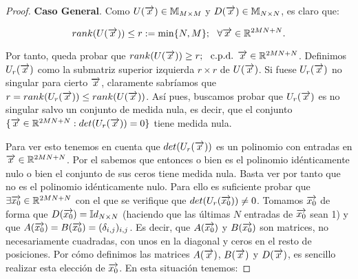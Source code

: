 \begin{proof}
    \textbf{Caso General}. Como $U(\overrightarrow{x}) \in \mathbb{M}_{M \times M}$ y $D(\overrightarrow{x}) \in \mathbb{M}_{N \times N}$, es claro que:

    \begin{equation}
        rank(U(\overrightarrow{x})) \leq r := \min \{ N, M  \}; \ \  \forall \overrightarrow{x} \in \mathbb{R}^{2MN + N}.
    \end{equation}

    Por tanto, queda probar que $rank(U(\overrightarrow{x})) \geq r; \ \  \text{c.p.d. } \overrightarrow{x} \in \mathbb{R}^{2MN + N}$. Definimos $U_r(\overrightarrow{x})$ como la submatriz superior izquierda $r \times r$ de $U(\overrightarrow{x})$. Si fuese $U_r(\overrightarrow{x})$ no singular para cierto $\overrightarrow{x}$, claramente sabríamos que $r = rank(U_r(\overrightarrow{x})) \leq rank(U(\overrightarrow{x}))$. Así pues, buscamos probar que $U_r(\overrightarrow{x})$ es no singular salvo un conjunto de medida nula, es decir, que el conjunto $\{ \overrightarrow{x} \in \mathbb{R}^{2MN + N} : det(U_r(\overrightarrow{x})) = 0  \}$ tiene medida nula.

    Para ver esto tenemos en cuenta que $det(U_r(\overrightarrow{x}))$ es un polinomio con entradas en $\overrightarrow{x} \in \mathbb{R}^{2MN + N}$. Por el  sabemos que entonces o bien es el polinomio idénticamente nulo o bien el conjunto de sus ceros tiene medida nula. Basta ver por tanto que no es el polinomio idénticamente nulo. Para ello es suficiente probar que $\exists \overrightarrow{x_0} \in \mathbb{R}^{2MN + N}$ con el que se verifique que $det(U_r(\overrightarrow{x_0})) \neq 0$. Tomamos $\overrightarrow{x_0}$ de forma que $D(\overrightarrow{x_0}) = \mathbb{I}d_{N \times N}$ (haciendo que las últimas $N$ entradas de $\overrightarrow{x_0}$ sean 1) y que $A(\overrightarrow{x_0}) = B(\overrightarrow{x_0}) = (\delta_{i,j})_{i,j}$. Es decir, que $A(\overrightarrow{x_0})$ y $B(\overrightarrow{x_0})$ son matrices, no necesariamente cuadradas, con unos en la diagonal y ceros en el resto de posiciones. Por cómo definimos las matrices $A(\overrightarrow{x})$, $B(\overrightarrow{x})$ y $D(\overrightarrow{x})$, es sencillo realizar esta elección de $\overrightarrow{x_0}$. En esta situación tenemos:


\end{proof}
